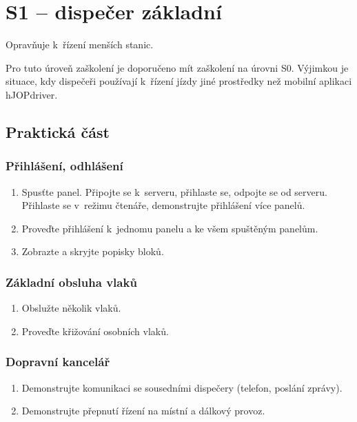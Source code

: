 \documentclass[12pt,a4paper]{article}
\begin{document}
\newpage

\section{S1 – dispečer základní}

Opravňuje k~řízení menších stanic.

Pro tuto úroveň zaškolení je doporučeno mít zaškolení na úrovni S0. Výjimkou
je situace, kdy dispečeři používají k~řízení jízdy jiné prostředky než mobilní
aplikaci hJOPdriver.

\subsection{Praktická část}

\subsubsection*{Přihlášení, odhlášení}
\begin{enumerate}[leftmargin=*]
\item Spusťte panel. Připojte se k~serveru, přihlaste se, odpojte se od
serveru. Přihlaste se v~režimu čtenáře, demonstrujte přihlášení více panelů.
\item Proveďte přihlášení k~jednomu panelu a ke všem spuštěným panelům.
\item Zobrazte a skryjte popisky bloků.
\end{enumerate}

\subsubsection*{Základní obsluha vlaků}
\begin{enumerate}[leftmargin=*]
\item Obslužte několik vlaků.
\item Proveďte křižování osobních vlaků.
\end{enumerate}

\subsubsection*{Dopravní kancelář}
\begin{enumerate}[leftmargin=*]
\item Demonstrujte komunikaci se sousedními dispečery (telefon, poslání zprávy).
\item Demonstrujte přepnutí řízení na místní a dálkový provoz.
\end{enumerate}
\end{document}
